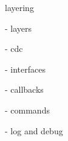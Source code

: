 

layering 



- layers

- cdc

- interfaces

- callbacks

- commands

- log and debug
















